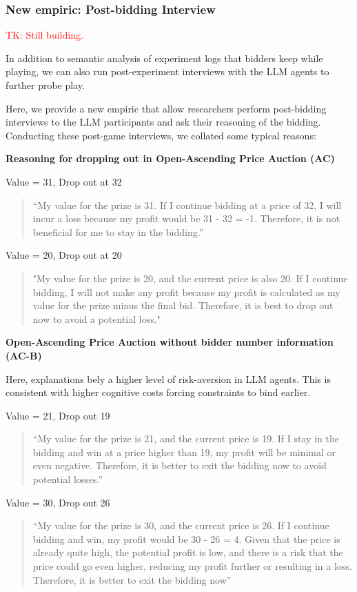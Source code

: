 \documentclass{article} %
\newcommand{\TK}[1]{\textcolor{red}{TK: #1}}
\begin{document}
\subsubsection{New empiric: Post-bidding Interview}
\TK{Still building.}

In addition to semantic analysis of experiment logs that bidders keep while playing, we can also run post-experiment interviews with the LLM agents to further probe play.

Here, we provide a new empiric that allow researchers perform post-bidding interviews to the LLM participants and ask their reasoning of the bidding. 
Conducting these post-game interviews, we collated some typical reasons:

\textbf{Reasoning for dropping out in Open-Ascending Price Auction (AC)}


Value = 31, Drop out at 32
\begin{quote}
    “My value for the prize is 31. If I continue bidding at a price of 32, I will incur a loss because my profit would be 31 - 32 = -1. Therefore, it is not beneficial for me to stay in the bidding.”
\end{quote}

Value = 20, Drop out at 20
\begin{quote}
    "My value for the prize is 20, and the current price is also 20. If I continue bidding, I will not make any profit because my profit is calculated as my value for the prize minus the final bid. Therefore, it is best to drop out now to avoid a potential loss."
\end{quote}

\textbf{Open-Ascending Price Auction without bidder number information (AC-B)}

Here, explanations bely a higher level of risk-aversion in LLM agents. 
This is consistent with higher cognitive costs forcing constraints to bind earlier.

Value = 21,  Drop out 19
\begin{quote}
    “My value for the prize is 21, and the current price is 19. If I stay in the bidding and win at a price higher than 19, my profit will be minimal or even negative. Therefore, it is better to exit the bidding now to avoid potential losses.”
\end{quote}

Value = 30,  Drop out 26
\begin{quote}
“My value for the prize is 30, and the current price is 26. If I continue bidding and win, my profit would be 30 - 26 = 4. Given that the price is already quite high, the potential profit is low, and there is a risk that the price could go even higher, reducing my profit further or resulting in a loss. Therefore, it is better to exit the bidding now”
\end{quote}
\end{document}
